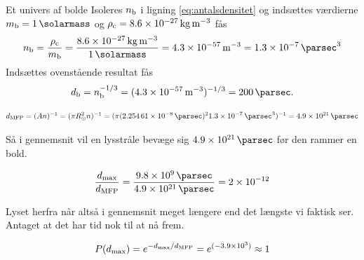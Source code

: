 \documentclass[crop=false, class=memoir]{standalone}
\begin{document}
\begin{opgave}{Et univers af bolde}
\opg Isoleres $n_\textup{b}$ i ligning \eqref{eq:antalsdensitet} og indsættes værdierne $m_\textup{b} = \SI{1}{\solarmass}$ og $\rho_\textup{c} = \SI{8.6e-27}{\kilo\gram\per\cubic\metre}$ fås
%
\begin{align*}
    n_\textup{b} = \frac{\rho_\textup{c}}{m_\textup{b}} = \frac{\SI{8,6e-27}{\kilo\gram\per\cubic\metre}}{\SI{1}{\solarmass}} = \SI{4,3e-57}{\per\cubic\metre} = \SI{1,3e-07}{\per\cubic\parsec}
\end{align*}
\opg Indsættes ovenstående resultat fås
%
\begin{align*}
    d_\textup{b} = n_\textup{b}^{-1/3} = (\SI{4,3e-57}{\per\cubic\metre})^{-1/3} = \SI{200}{\parsec}.
\end{align*}
%


\opg 

\begin{align}
	d_\textup{MFP} = (A n)^{-1} = (\pi R_\odot^2 n)^{-1} = (\pi (\SI{2,25461e-8}{\parsec})^2 \SI{1,3e-07}{\per\cubic\parsec})^{-1} =  \SI{4.9e21}{\parsec} %
\end{align}

Så i gennemsnit vil en lysstråle bevæge sig $\SI{4.9e21}{\parsec}$ før den rammer en bold.

\begin{align}
    \frac{d_\textup{max}}{d_\textup{MFP}} = \frac{\SI{9.8e9}{\parsec} }{\SI{4.9e21}{\parsec}} = \num{2e-12} %
\end{align}

Lyset herfra når altså i gennemsnit meget længere end det længste vi faktisk ser. Antaget at det har tid nok til at nå frem.

\opg 

\begin{align}
	P(d_\textup{max}) = e^{-d_\textup{max}/d_\textup{MFP}} = e^{(\num{-3.9e3})} \approx 1
\end{align}


\end{opgave}
\end{document}

